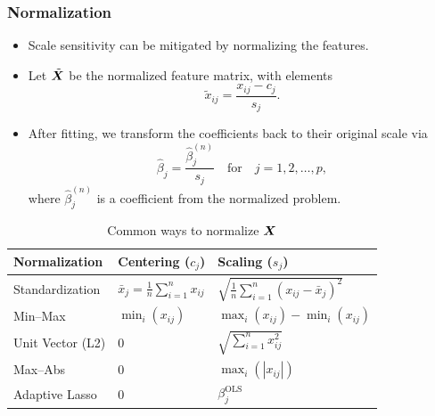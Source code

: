 \documentclass[aspectratio=1610,onlytextwidth]{beamer}
\begin{document}
\begin{frame}[c]
  \frametitle{Normalization}

  \begin{itemize}[<+->]
    \item Scale sensitivity can be mitigated by normalizing the features.
    \item Let \(\tilde{\bm{X}}\) be the normalized feature matrix, with elements
          \[
            \tilde{x}_{ij} = \frac{x_{ij} - c_{j}}{s_j}.
          \]
    \item After fitting, we transform the coefficients back to their original scale via
          \[
            \hat\beta_j = \frac{\hat\beta^{(n)}_j}{s_j} \quad\text{for}\quad j = 1,2,\dots,p,
          \]
          where \(\hat\beta^{(n)}_j\) is a coefficient from the normalized problem.
  \end{itemize}
\end{frame}

\begin{frame}[c]
  \begin{table}[hbt]
    \centering
    \caption{Common ways to normalize \(\bm{X}\)}
    \begin{tabular}{lll}
      \toprule
      Normalization    & Centering (\(c_{j}\))                          & Scaling (\(s_j\))                                         \\
      \midrule
      Standardization  & \(\bar{x}_j = \frac{1}{n}\sum_{i=1}^n x_{ij}\) & \(\sqrt{\frac{1}{n}\sum_{i=1}^n (x_{ij} - \bar{x}_j)^2}\) \\
      \addlinespace
      Min--Max         & \(\min_i(x_{ij})\)                             & \(\max_i(x_{ij}) - \min_i(x_{ij})\)                       \\
      \addlinespace
      Unit Vector (L2) & 0                                              & \(\sqrt{\sum_{i=1}^n x_{ij}^2}\)                          \\
      \addlinespace
      Max--Abs         & 0                                              & \(\max_i(|x_{ij}|)\)                                      \\
      \addlinespace
      Adaptive Lasso   & 0                                              & \(\beta_j^\text{OLS}\)                                    \\
      \bottomrule
    \end{tabular}
  \end{table}
\end{frame}
\end{document}
